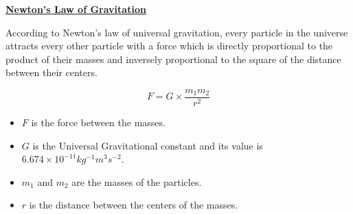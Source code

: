 \begin{center}
\Large{\textbf{\underline{Newton's Law of Gravitation}}}
\end{center}
According to Newton's law of universal gravitation, every particle in the universe attracts every other particle with a force which is directly proportional to the product of their masses and inversely proportional to the square of the distance between their centers.

$$ F = G \times \frac{m_1 m_2}{r^2} $$ 

\begin{itemize}
  \item $F$ is the force between the masses.
  \item $G$ is the Universal Gravitational constant and its value is $6.674 \times 10 ^{-11}  kg^{-1}m^{3}s^{-2}$.
  \item $m_1$ and $m_2$ are the masses of the particles.
  \item $r$ is the distance between the centers of the masses.
\end{itemize}


